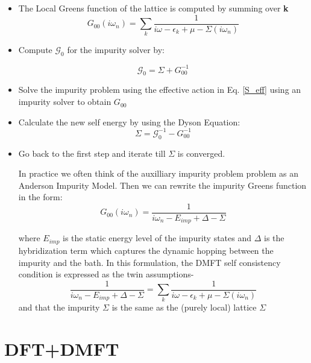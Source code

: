 \documentclass[10pt]{ruthesis}
\begin{document}
\begin{itemize}
\item The Local Greens function of the lattice is computed by summing over \textbf{k}
\begin{equation}
G_{00}(i\omega_n)= \sum_k \dfrac{1}{i\omega -\epsilon_k +\mu -\Sigma(i\omega_n)}
\end{equation}
\item Compute $\mathcal{G}_0$ for the impurity solver by:

\begin{equation}
\mathcal{G}_0=\Sigma + G_{00}^{-1}
\end{equation}

\item Solve the impurity problem using the effective action in Eq. \ref{S_eff} using an impurity solver to obtain $G_{00}$

\item Calculate the new self energy by using the Dyson Equation:
\begin{equation}
\Sigma= \mathcal{G}_0^{-1} -G_{00}^{-1}
\end{equation}

\item Go back to the first step and iterate till  $\Sigma$ is converged.

In practice we often think of the auxilliary impurity problem problem as an Anderson Impurity Model. Then we can rewrite the impurity Greens function in the form:
\begin{equation}
G_{00}(i \omega_n)= \dfrac{1}{i \omega_n -E_{imp}+ \Delta- \Sigma}
\end{equation}

where $E_{imp}$ is the static energy level of the impurity states and $\Delta$ is the hybridization term which captures the dynamic hopping between the impurity and the bath. In this formulation, the DMFT self consistency condition is expressed as the twin assumptions-
\begin{equation}
\dfrac{1}{i \omega_n -E_{imp}+ \Delta- \Sigma}=  \sum_k \dfrac{1}{i\omega -\epsilon_k +\mu -\Sigma(i\omega_n)}
\end{equation}
and that the impurity  $\Sigma$ is the same as the (purely local) lattice $\Sigma$
\end{itemize}  
%

\pagebreak
\chapter{DFT+DMFT}
\end{document}
